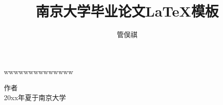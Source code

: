 \documentclass[winfonts,master,twoside,AutoFakeBold= {2}]{njuthesis}
\title{南京大学毕业论文\LaTeX 模板}
\author{管俣祺}
\institute{南京大学}
\begin{document}

\maketitle
\makeenglishtitle


\frontmatter

\begin{abstract}
\lipsum[1-2]


\end{abstract}

\begin{englishabstract}
wwwwwwwwwwwwww

\end{englishabstract}

%
\begin{preface}
\lipsum[1]
\vspace{1cm}
\begin{flushright}
作者\\
20xx年夏于南京大学
\end{flushright}

\end{preface}

\tableofcontents

\listoffigures

\listoftables
\end{document}
